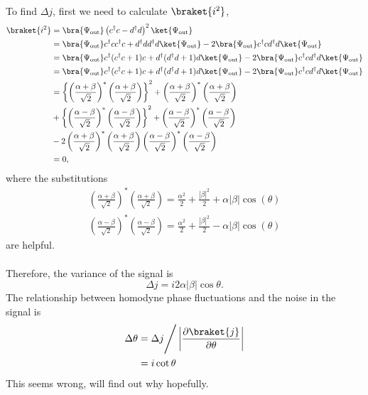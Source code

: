 \paragraph{}
To find $\Delta j$, first we need to calculate $\braket{i^2}$,
\begin{align}
\braket{i^2} &= \bra{\Psi_{\rm{out}}}\left(c^\dagger c - d^\dagger d\right)^2\ket{\Psi_{\rm{out}}} \\
&= \bra{\Psi_{\rm{out}}}c^\dagger c c^\dagger c + d^\dagger dd^\dagger d\ket{\Psi_{\rm{out}}} - 2\bra{\Psi_{\rm{out}}}c^\dagger c d^\dagger d\ket{\Psi_{\rm{out}}}\nonumber \\
&= \bra{\Psi_{\rm{out}}}c^\dagger (c^\dagger c+1) c + d^\dagger (d^\dagger d+1)  d\ket{\Psi_{\rm{out}}} - 2\bra{\Psi_{\rm{out}}}c^\dagger c d^\dagger d\ket{\Psi_{\rm{out}}}\nonumber \\
&= \bra{\Psi_{\rm{out}}}c^\dagger (c^\dagger c+1) c + d^\dagger (d^\dagger d+1)  d\ket{\Psi_{\rm{out}}} - 2\bra{\Psi_{\rm{out}}}c^\dagger c d^\dagger d\ket{\Psi_{\rm{out}}}\nonumber\\
&=  \left\lbrace\left(\frac{\alpha + \beta}{\sqrt{2}} \right)^*\left(\frac{\alpha + \beta}{\sqrt{2}} \right)\right\rbrace^2 + \left(\frac{\alpha + \beta}{\sqrt{2}} \right)^*\left(\frac{\alpha + \beta}{\sqrt{2}} \right) \nonumber\\
& + \left\lbrace\left(\frac{\alpha - \beta}{\sqrt{2}} \right)^*\left(\frac{\alpha - \beta}{\sqrt{2}} \right)\right\rbrace^2 + \left(\frac{\alpha - \beta}{\sqrt{2}} \right)^*\left(\frac{\alpha - \beta}{\sqrt{2}} \right)\nonumber\\
& - 2 \left(\frac{\alpha + \beta}{\sqrt{2}} \right)^*\left(\frac{\alpha + \beta}{\sqrt{2}} \right)\left(\frac{\alpha - \beta}{\sqrt{2}} \right)^*\left(\frac{\alpha - \beta}{\sqrt{2}} \right) \nonumber\\
&= 0, \nonumber 
\end{align}
where the substitutions
\begin{align}
\left(\frac{\alpha + \beta}{\sqrt{2}} \right)^*\left(\frac{\alpha + \beta}{\sqrt{2}} \right) = \frac{\alpha^2}{2} + \frac{|\beta|^2}{2} + \alpha\left|\beta\right|\cos(\theta) \\ \left(\frac{\alpha - \beta}{\sqrt{2}} \right)^*\left(\frac{\alpha - \beta}{\sqrt{2}} \right) = \frac{\alpha^2}{2} + \frac{|\beta|^2}{2} - \alpha\left|\beta\right|\cos(\theta)
\end{align}
are helpful.
\paragraph{}
Therefore, the variance of the signal is 
\begin{equation}
	\Delta j = i 2\alpha\left|\beta\right|\cos\theta.
\end{equation}
The relationship between homodyne phase fluctuations and the noise in the signal is
\begin{align}
\Delta \theta &= \Delta j \Bigg/ \left|\frac{\partial \braket{j}}{\partial \theta}\right|\\
 &= i\cot\theta
\end{align}
This seems wrong, will find out why hopefully.
